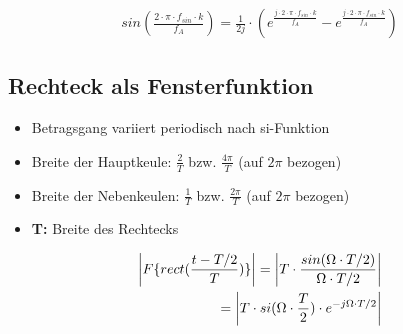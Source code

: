 \documentclass[10pt,a4paper]{article}
\begin{document}
\begin{mdframed}[style=exercise]
    \begin{align}
     sin(\frac{2\cdot\pi\cdot f_{sin}\cdot k}{f_{A}}) = \frac{1}{2j}\cdot (e^{\frac{j\cdot 2\cdot\pi\cdot f_{sin}\cdot k}{f_{A}}}-e^{\frac{j\cdot 2\cdot\pi\cdot f_{sin}\cdot k}{f_{A}}})
    \end{align}
\end{mdframed}
\newpage
\subsection{Rechteck als Fensterfunktion}
\begin{itemize}
    \item Betragsgang variiert periodisch nach si-Funktion
    \item Breite der Hauptkeule: $\frac{2}{T}$ bzw. $\frac{4\pi}{T}$ (auf $2\pi$ bezogen)
    \item Breite der Nebenkeulen: $\frac{1}{T}$ bzw. $\frac{2\pi}{T}$ (auf $2\pi$ bezogen)
    \item \textbf{T:} Breite des Rechtecks
  \end{itemize}
\begin{mdframed}[style=exercise]
    \begin{align}
\abs{F\{rect(\dfrac{t-T/2}{T})\}} = \abs{T \cdot \dfrac{sin(\Omega\cdot T/2)}{\Omega\cdot T/2}}\\
= \abs{T \cdot si(\Omega\cdot\frac{T}{2})\cdot e^{-j\Omega\cdot T / 2}}
    \end{align}
\end{mdframed}
\end{document}
